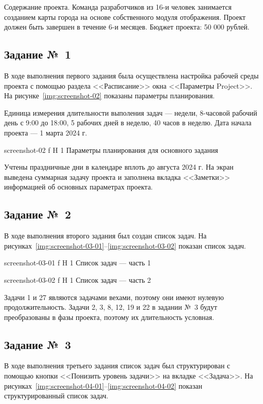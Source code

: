 \documentclass{bmstu}
\begin{document}
Содержание проекта. 
Команда разработчиков из 16-и человек занимается созданием карты города на основе собственного модуля отображения. 
Проект должен быть завершен в течение 6-и месяцев. 
Бюджет проекта: 50 000 рублей.

\subsection{Задание №~1}

В ходе выполнения первого задания была осуществлена настройка рабочей среды проекта с помощью раздела <<Расписание>> окна <<Параметры Project>>. 
На рисунке~\ref{img:screenshot-02} показаны параметры планирования.

Единица измерения длительности выполения задач --- недели, 8-часовой рабочий день с 9:00 до 18:00, 5 рабочих дней в неделю, 40 часов в неделю. 
Дата начала проекта --- 1 марта 2024 г.
    
    {screenshot-02}
    {f}
    {H}
    {1\textwidth}
    {Параметры планирования для основного задания}
    
Учтены праздничные дни в календаре вплоть до августа 2024 г. 
На экран выведена суммарная задачу проекта и заполнена вкладка <<Заметки>> информацией об основных параметрах проекта.

\subsection{Задание №~2}

В ходе выполнения второго задания был создан список задач. 
На рисунках~\ref{img:screenshot-03-01}--\ref{img:screenshot-03-02} показан список задач.
    
    {screenshot-03-01}
    {f}
    {H}
    {1\textwidth}
    {Список задач --- часть 1}
    
    {screenshot-03-02}
    {f}
    {H}
    {1\textwidth}
    {Список задач --- часть 2}
    
Задачи 1 и 27 являются задачами вехами, поэтому они имеют нулевую
продолжительность. 
Задачи 2, 3, 8, 12, 19 и 22 в задании №~3 будут преобразованы в фазы проекта, поэтому их длительность условная.

\subsection{Задание №~3}

В ходе выполнения третьего задания список задач был структурирован с помощью кнопки <<Понизить уровень задачи>> на вкладке <<Задача>>. 
На рисунках~\ref{img:screenshot-04-01}--\ref{img:screenshot-04-02} показан структурированный список задач.
    
\end{document}
